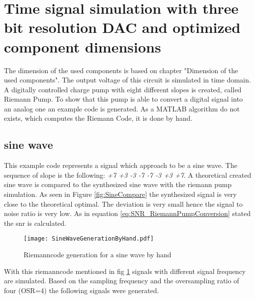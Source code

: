 
\section{Time signal simulation with three bit resolution DAC and optimized component dimensions}
The dimension of the used components is based on chapter "Dimension of the used components". The output voltage of this circuit is simulated in time domain.
A digitally controlled charge pump with eight different slopes is created, called Riemann Pump. To show that this pump is able to convert a digital signal into an analog one an example code is generated. As a MATLAB algorithm do not exists, which computes the Riemann Code, it is done by hand.

\subsection{sine wave}
This example code represents a signal which approach to be a sine wave. The sequence of slope is the following: \textit{+7 +3 -3 -7 -7 -3 +3 +7}.
A theoretical created sine wave is compared to the synthesized sine wave with the riemann pump simulation. As seen in Figure \ref{fig:SineCompare} the synthesized signal is very close to the theoretical optimal. The deviation is very small hence the signal to noise ratio is very low. As in equation \ref{eq:SNR_RiemannPumpConversion} stated the snr is calculated.


 \begin{figure}[htb!]
   \centering
   \texttt{[image: SineWaveGenerationByHand.pdf]}
   \caption{Riemanncode generation for a sine wave by hand}
   \label{fig:SineWaveCodeGeneration}
\end{figure}
 
With this riemanncode mentioned in fig \ref{fig:SineWaveCodeGeneration} signals with different signal frequency are simulated. Based on the sampling frequency and the oversampling ratio of four (OSR=4) the following signals were generated.


